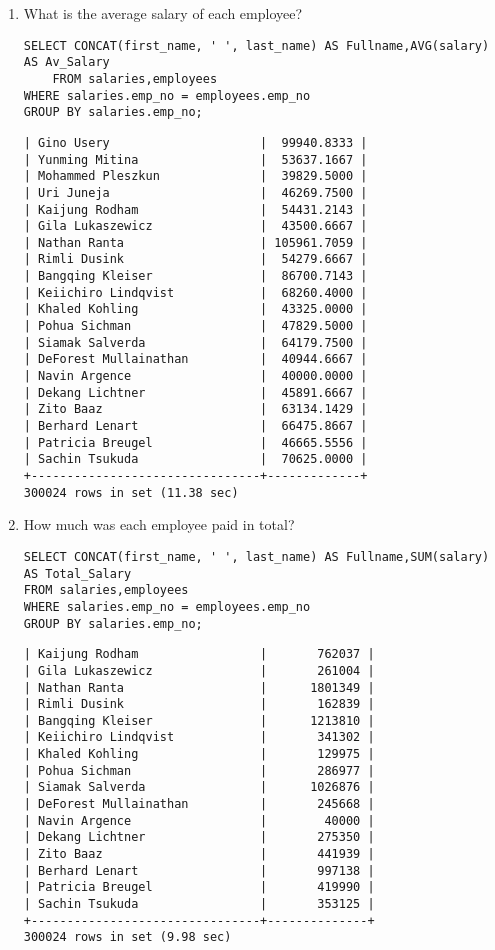 \documentclass[]{article}
\begin{document}
\begin{enumerate}
\item What is the average salary of each employee?

\begin{verbatim}
SELECT CONCAT(first_name, ' ', last_name) AS Fullname,AVG(salary) AS Av_Salary 
	FROM salaries,employees
WHERE salaries.emp_no = employees.emp_no
GROUP BY salaries.emp_no;
\end{verbatim}
	
\begin{verbatim}
| Gino Usery                     |  99940.8333 |
| Yunming Mitina                 |  53637.1667 |
| Mohammed Pleszkun              |  39829.5000 |
| Uri Juneja                     |  46269.7500 |
| Kaijung Rodham                 |  54431.2143 |
| Gila Lukaszewicz               |  43500.6667 |
| Nathan Ranta                   | 105961.7059 |
| Rimli Dusink                   |  54279.6667 |
| Bangqing Kleiser               |  86700.7143 |
| Keiichiro Lindqvist            |  68260.4000 |
| Khaled Kohling                 |  43325.0000 |
| Pohua Sichman                  |  47829.5000 |
| Siamak Salverda                |  64179.7500 |
| DeForest Mullainathan          |  40944.6667 |
| Navin Argence                  |  40000.0000 |
| Dekang Lichtner                |  45891.6667 |
| Zito Baaz                      |  63134.1429 |
| Berhard Lenart                 |  66475.8667 |
| Patricia Breugel               |  46665.5556 |
| Sachin Tsukuda                 |  70625.0000 |
+--------------------------------+-------------+
300024 rows in set (11.38 sec)
\end{verbatim}
	
\item How much was each employee paid in total?

\begin{verbatim}
SELECT CONCAT(first_name, ' ', last_name) AS Fullname,SUM(salary) AS Total_Salary 
FROM salaries,employees
WHERE salaries.emp_no = employees.emp_no
GROUP BY salaries.emp_no;
\end{verbatim}
	
\begin{verbatim}
| Kaijung Rodham                 |       762037 |
| Gila Lukaszewicz               |       261004 |
| Nathan Ranta                   |      1801349 |
| Rimli Dusink                   |       162839 |
| Bangqing Kleiser               |      1213810 |
| Keiichiro Lindqvist            |       341302 |
| Khaled Kohling                 |       129975 |
| Pohua Sichman                  |       286977 |
| Siamak Salverda                |      1026876 |
| DeForest Mullainathan          |       245668 |
| Navin Argence                  |        40000 |
| Dekang Lichtner                |       275350 |
| Zito Baaz                      |       441939 |
| Berhard Lenart                 |       997138 |
| Patricia Breugel               |       419990 |
| Sachin Tsukuda                 |       353125 |
+--------------------------------+--------------+
300024 rows in set (9.98 sec)
\end{verbatim}	


\end{enumerate}
\end{document}
